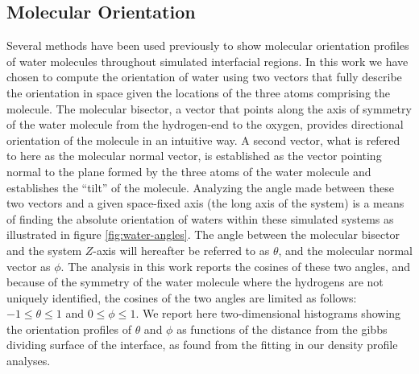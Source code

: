 \subsection{Molecular Orientation}
Several methods have been used previously to show molecular orientation profiles of water molecules throughout simulated interfacial regions.\cite{Someone} In this work we have chosen to compute the orientation of water using two vectors that fully describe the orientation in space given the locations of the three atoms comprising the molecule. The molecular bisector, a vector that points along the axis of symmetry of the water molecule from the hydrogen-end to the oxygen, provides directional orientation of the molecule in an intuitive way. A second vector, what is refered to here as the molecular normal vector, is established as the vector pointing normal to the plane formed by the three atoms of the water molecule and establishes the ``tilt'' of the molecule. Analyzing the angle made between these two vectors and a given space-fixed axis (the long axis of the system) is a means of finding the absolute orientation of waters within these simulated systems as illustrated in figure \ref{fig:water-angles}. The angle between the molecular bisector and the system $Z$-axis will hereafter be referred to as $\theta$, and the molecular normal vector as $\phi$. The analysis in this work reports the cosines of these two angles, and because of the symmetry of the water molecule where the hydrogens are not uniquely identified, the cosines of the two angles are limited as follows: $-1\le\theta\le1$ and $0\le\phi\le1$. We report here two-dimensional histograms showing the orientation profiles of $\theta$ and $\phi$ as functions of the distance from the gibbs dividing surface of the interface, as found from the fitting in our density profile analyses.

